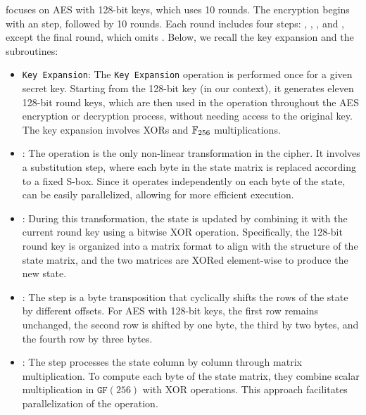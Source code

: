 \hippo focuses on AES with 128-bit keys, which uses 10 rounds. The encryption begins with an \AddRoundKey step, followed by 10 rounds. Each round includes four steps: \SubBytes, \ShiftRows, \MixColumns, and \AddRoundKey, except the final round, which omits \MixColumns. Below, we recall the key expansion and the subroutines:
\begin{itemize}
\item \texttt{Key Expansion}: The \texttt{Key Expansion} operation is performed once for a given secret key. Starting from the 128-bit key (in our context), it generates eleven 128-bit round keys, which are then used in the \AddRoundKey operation throughout the AES encryption or decryption process, without needing access to the original key. The key expansion involves XORs and $\mathbb{F}_{256}$ multiplications.

    \item \SubBytes: The \SubBytes operation is the only non-linear transformation in the cipher. It involves a substitution step, where each byte in the state matrix is replaced according to a fixed S-box. Since it operates independently on each byte of the state, \SubBytes can be easily parallelized, allowing for more efficient execution.
    \item \AddRoundKey: 
    During this transformation, the state is updated by combining it with the current round key using a bitwise XOR operation. Specifically, the 128-bit round key is organized into a matrix format to align with the structure of the state matrix, and the two matrices are XORed element-wise to produce the new state.
   
    \item \ShiftRows: The \ShiftRows step is a byte transposition that cyclically shifts the rows of the state by different offsets. For AES with 128-bit keys, the first row remains unchanged, the second row is shifted by one byte, the third by two bytes, and the fourth row by three bytes. 

    \item \MixColumns: The \MixColumns step processes the state column by column through matrix multiplication. To compute each byte of the state matrix, they combine scalar multiplication in $\mathtt{GF}(256)$ with XOR operations. This approach facilitates parallelization of the operation.  
    
    
\end{itemize}

